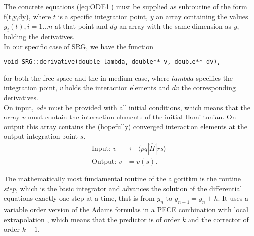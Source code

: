 The concrete equations (\ref{eq:ODE1}) must be supplied as subroutine of the form 
\be
f(t,y,dy),
\label{eq:devfunction}
\ee
where $t$ is a specific integration point, $y$ an array containing the values $y_i(t), i=1\dots n$ at that point and $dy$ an array with the same dimension as $y$, holding the derivatives. \\
In our specific case of SRG, we have the function
\begin{lstlisting}[backgroundcolor=\color{lighter-gray},numbers=none]
void SRG::derivative(double lambda, double** v, double** dv),
\end{lstlisting}
for both the free space and the in-medium case, where $lambda$ specifies the integration point, $v$ holds the interaction elements and $dv$ the corresponding derivatives. \\
On input, \textit{ode} must be provided with all initial conditions, which means that the array $v$ must contain the interaction elements of the initial Hamiltonian. 
On output this array contains the (hopefully) converged interaction elements at the output integration point $s$.
\begin{align*}
\mbox{Input: } v& \leftarrow  \langle p q | \hat{H} | r s \rangle \\
\mbox{Output: } v& = v(s).
\end{align*}

The mathematically most fundamental routine of the algorithm is the routine \textit{step}, which is the basic integrator and advances the solution of the differential equations exactly one step at a time, that is from $y_n$ to $y_{n+1} = y_{n}+h$. It uses a variable order version of the Adams formulas in a PECE combination with local extrapolation \cite{shampine1975computer}, which means that the predictor is of order $k$ and the corrector of order $k+1$.

